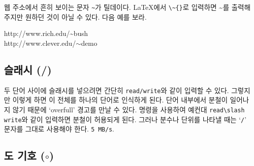 웹 주소에서 흔히 보이는 문자 \verb|~|가 틸데이다. \LaTeX 에서 \verb|\~{}|로 입력하면
\~{}를 출력해주지만 원하던 것이 아닐 수 있다. 다음 예를 보라.

\begin{example}
http://www.rich.edu/\~{}bush \\
http://www.clever.edu/$\sim$demo
\end{example}

\subsection{슬래시 (/)} 

두 단어 사이에 슬래시를 넣으려면 간단히 \texttt{read/write}와 같이 입력할 수 있다.
그렇지만 이렇게 하면 이 전체를 하나의 단어로 인식하게 된다. 단어 내부에서 분철이 일어나지 않기 
때문에 `overfull' 경고를 만날 수 있다.  명령을 사용하여 예컨대 \verb|read\slash write|와 
같이 입력하면 분철이 허용되게 된다. 그러나 분수나 단위를 나타낼 때는 `\texttt{/}' 문자를
그대로 사용해야 한다.
\texttt{5 MB/s}.

\subsection{도 기호 \texorpdfstring{($\circ$)}{}}

